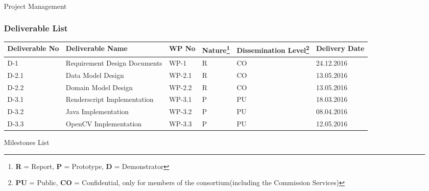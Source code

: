 \documentclass[12pt, a4paper]{article} \pagenumbering{gobble}
\begin{document}
\begin{section}{Project Management}
\subsubsection{Deliverable List}
    \begin{tabularx}{\textwidth}{|*{6}{Y|}}
        \hline
      \textbf{Deliverable No} & \textbf{Deliverable Name} & \textbf{WP No} & \textbf{Nature}\footnote{\textbf{R} = Report, \textbf{P} = Prototype, \textbf{D} = Demonstrator} & \textbf{Dissemination Level}\footnote{\textbf{PU} = Public, \textbf{CO} = Confidential, only for members of the consortium(including the Commission Services)} & \textbf{Delivery Date} \\
      \hline
        D-1 & Requirement Design Documents & WP-1 & R & CO & 24.12.2016 \\
        \hline
        D-2.1 & Data Model Design & WP-2.1 & R & CO & 13.05.2016 \\
        \hline
        D-2.2 & Domain Model Design & WP-2.2 & R & CO & 13.05.2016 \\
        \hline
        D-3.1 & Renderscript Implementation & WP-3.1 & P & PU & 18.03.2016 \\
        \hline
        D-3.2 & Java Implementation & WP-3.2 & P & PU & 08.04.2016 \\
        \hline
        D-3.3 & OpenCV Implementation & WP-3.3 & P & PU & 12.05.2016 \\
        \hline
    \end{tabularx}
\begin{subsubsection}{Milestones List}


\end{subsubsection}
\end{section}
\end{document}
